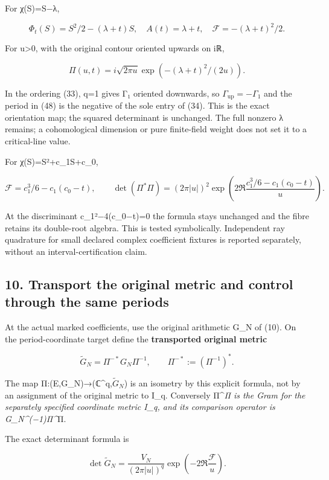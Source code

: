 For χ(S)=S−λ,

\[
\Phi_t(S)=S^2/2-(\lambda+t)S,
\quad A(t)=\lambda+t,
\quad\mathcal F=-(\lambda+t)^2/2.
\tag{47}
\]

For u\textgreater0, with the original contour oriented upwards on iℝ,

\[
\Pi(u,t)=i\sqrt{2\pi u}\exp(-(\lambda+t)^2/(2u)).
\tag{48}
\]

In the ordering (33), q=1 gives Γ₁ oriented downwards, so \(\Gamma_{\mathrm{up}}=-\Gamma_1\) and the period in (48) is the negative of the sole entry of (34). This is the exact orientation map; the squared determinant is unchanged. The full nonzero λ remains; a cohomological dimension or pure finite-field weight does not set it to a critical-line value.

For χ(S)=S²+c\_1S+c\_0,

\[
\mathcal F=c_1^3/6-c_1(c_0-t),
\qquad
\det(\Pi^*\Pi)
 =(2\pi|u|)^2
 \exp\!\left(2\Re\frac{c_1^3/6-c_1(c_0-t)}u\right).
\tag{49}
\]

At the discriminant c\_1²−4(c\_0−t)=0 the formula stays unchanged and the fibre retains its double-root algebra. This is tested symbolically. Independent ray quadrature for small declared complex coefficient fixtures is reported separately, without an interval-certification claim.

\subsection{10. Transport the original metric and control through the same periods}\label{endpoint-sga_trace_period--transport-the-original-metric-and-control-through-the-same-periods}

At the actual marked coefficients, use the original arithmetic G\_N of (10). On the period-coordinate target define the \textbf{transported original metric}

\[
\widetilde G_N=\Pi^{-*}G_N\Pi^{-1},
\qquad
\Pi^{-*}:=(\Pi^{-1})^*.
\tag{50}
\]

The map Π:(E,G\_N)→(ℂ\^{}q,\(\widetilde G_N\)) is an isometry by this explicit formula, not by an assignment of the original metric to I\_q. Conversely Π\^{}\emph{Π is the Gram for the separately specified coordinate metric I\_q, and its comparison operator is G\_N\^{}(−1)Π\^{}}Π.

The exact determinant formula is

\[
\boxed{
\det\widetilde G_N
 =\frac{V_N}{(2\pi|u|)^q}
 \exp\!\left(-2\Re\frac{\mathcal F}u\right).
}
\tag{51}
\]

